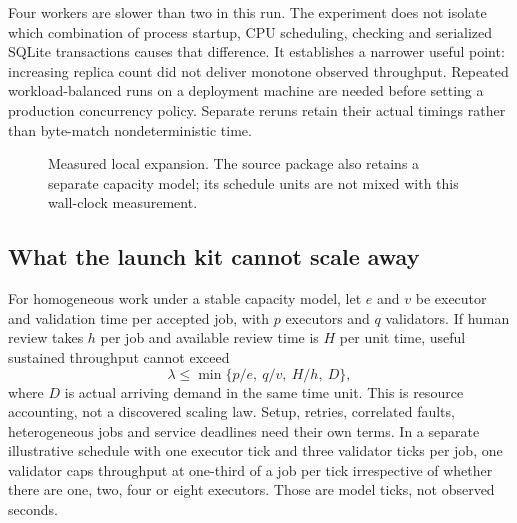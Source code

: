 \documentclass[11pt,letterpaper]{article}
\begin{document}
Four workers are slower than two in this run. The experiment does not isolate which combination of process startup, CPU scheduling, checking and serialized SQLite transactions causes that difference. It establishes a narrower useful point: increasing replica count did not deliver monotone observed throughput. Repeated workload-balanced runs on a deployment machine are needed before setting a production concurrency policy. Separate reruns retain their actual timings rather than byte-match nondeterministic time.

\begin{figure}[htbp]\centering
{}
\caption{Measured local expansion. The source package also retains a separate capacity model; its schedule units are not mixed with this wall-clock measurement.}
\label{fig:scale}
\end{figure}

\subsection{What the launch kit cannot scale away}
For homogeneous work under a stable capacity model, let $e$ and $v$ be executor and validation time per accepted job, with $p$ executors and $q$ validators. If human review takes $h$ per job and available review time is $H$ per unit time, useful sustained throughput cannot exceed
\begin{equation}
 \lambda\le\min\{p/e,\ q/v,\ H/h,\ D\},
 \label{eq:capacity}
\end{equation}
where $D$ is actual arriving demand in the same time unit. This is resource accounting, not a discovered scaling law. Setup, retries, correlated faults, heterogeneous jobs and service deadlines need their own terms. In a separate illustrative schedule with one executor tick and three validator ticks per job, one validator caps throughput at one-third of a job per tick irrespective of whether there are one, two, four or eight executors. Those are model ticks, not observed seconds.
\end{document}
